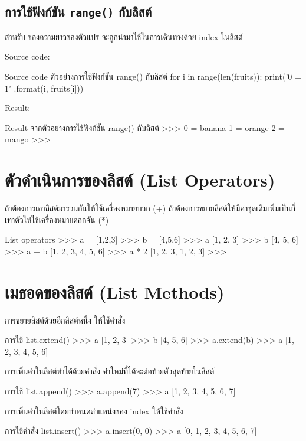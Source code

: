 \subsection{การใช้ฟังก์ชัน  \texttt{range()} กับลิสต์}

สำหรับ   ของความยาวของตัวแปร จะถูกนำมาใช้ในการเดินทางด้วย index ในลิสต์

Source code:
\begin{codelist}{Source code ตัวอย่างการใช้ฟังก์ชัน range() กับลิสต์}{}
for i in range(len(fruits)):
    print('{0} = {1}' .format(i, fruits[i]))
\end{codelist}

Result:
\begin{codelist}{Result จากตัวอย่างการใช้ฟังก์ชัน range() กับลิสต์}{}
>>>
0 = banana
1 = orange
2 = mango
>>>
\end{codelist}

\section{ตัวดำเนินการของลิสต์ (List Operators)}

ถ้าต้องการเอาลิสต์มารวมกันให้ใช้เครื่องหมายบวก (+) ถ้าต้องการขยายลิสต์ให้มีค่าชุดเดิมเพิ่มเป็นกี่เท่าตัวให้ใช้เครื่องหมายดอกจัน (*)

\begin{codelist}{List operators}{}
>>> a = [1,2,3]
>>> b = [4,5,6]
>>> a
[1, 2, 3]
>>> b
[4, 5, 6]
>>> a + b
[1, 2, 3, 4, 5, 6]
>>> a * 2
[1, 2, 3, 1, 2, 3]
>>>
\end{codelist}


\section{เมธอดของลิสต์ (List Methods)}

การขยายลิสต์ด้วยอีกลิสต์หนึ่ง ให้ใช้คำสั่ง  
\begin{codelist}{การใช้ list.extend()}{}
>>> a
[1, 2, 3]
>>> b
[4, 5, 6]
>>> a.extend(b)
>>> a
[1, 2, 3, 4, 5, 6]
\end{codelist}

การเพิ่มค่าในลิสต์ทำได้ด้วยคำสั่ง   ค่าใหม่ที่ได้จะต่อท้ายตัวสุดท้ายในลิสต์
\begin{codelist}{การใช้ list.append()}{}
>>> a.append(7)
>>> a
[1, 2, 3, 4, 5, 6, 7]
\end{codelist}


การเพิ่มค่าในลิสต์โดยกำหนดตำแหน่งของ  index ให้ใช้คำสั่ง  
\begin{codelist}{การใช้คำสั่ง list.insert()}{}
>>> a.insert(0, 0)
>>> a
[0, 1, 2, 3, 4, 5, 6, 7]
\end{codelist}


